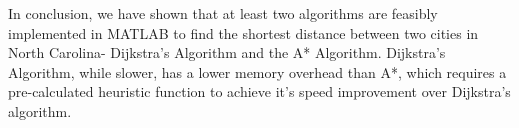 \documentclass[]{../ncmathy}
\begin{document}
In conclusion, we have shown that at least two algorithms are feasibly implemented in MATLAB to find the shortest distance between two cities in North Carolina- Dijkstra's Algorithm and the A* Algorithm. Dijkstra's Algorithm, while slower, has a lower memory overhead than A*, which requires a pre-calculated heuristic function to achieve it's speed improvement over Dijkstra's algorithm.
\end{document}
